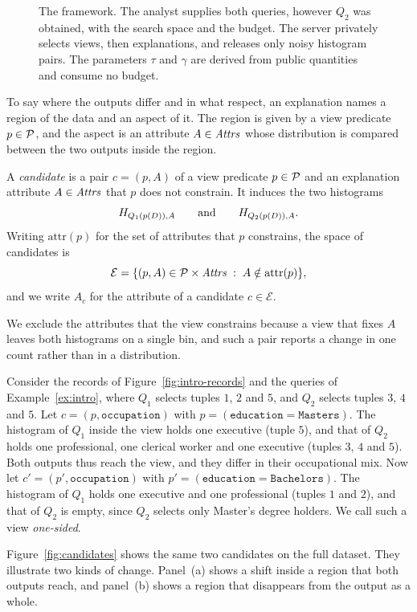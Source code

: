 \begin{figure}[t]
\centering

\caption{The \sys{} framework. The analyst supplies both queries, however $Q_2$ was obtained, with the search space and the budget. The server privately selects views, then explanations, and releases only noisy histogram pairs. The parameters $\tau$ and $\gamma$ are derived from public quantities and consume no budget.}
\label{fig:framework}
\end{figure}

To say where the outputs differ and in what respect, an explanation names a region of the data and an aspect of it.
The region is given by a view predicate $p\in\mathcal{P}$, and the aspect is an attribute $A\in\mathit{Attrs}$ whose distribution is compared between the two outputs inside the region.

\begin{definition}
\label{def:candidate}
A \emph{candidate} is a pair $c=(p,A)$ of a view predicate $p\in\mathcal{P}$ and an explanation attribute $A\in\mathit{Attrs}$ that $p$ does not constrain.
It induces the two histograms
\[
    H_{Q_1(p(D)),A}
    \qquad\text{and}\qquad
    H_{Q_2(p(D)),A}.
\]
Writing $\mathrm{attr}(p)$ for the set of attributes that $p$ constrains, the space of candidates is
\[
\mathcal{E}=\{(p,A)\in\mathcal{P}\times\mathit{Attrs} \;:\; A\notin\mathrm{attr}(p)\},
\]
and we write $A_c$ for the attribute of a candidate $c\in\mathcal{E}$.
\end{definition}

We exclude the attributes that the view constrains because a view that fixes $A$ leaves both histograms on a single bin, and such a pair reports a change in one count rather than in a distribution.

\begin{example}
\label{ex:candidate}
Consider the records of Figure~\ref{fig:intro-records} and the queries of Example~\ref{ex:intro}, where $Q_1$ selects tuples $1$, $2$ and $5$, and $Q_2$ selects tuples $3$, $4$ and $5$.
Let $c=(p,\texttt{occupation})$ with $p=(\texttt{education}=\texttt{Masters})$.
The histogram of $Q_1$ inside the view holds one executive (tuple $5$), and that of $Q_2$ holds one professional, one clerical worker and one executive (tuples $3$, $4$ and $5$).
Both outputs thus reach the view, and they differ in their occupational mix.
Now let $c'=(p',\texttt{occupation})$ with $p'=(\texttt{education}=\texttt{Bachelors})$.
The histogram of $Q_1$ holds one executive and one professional (tuples $1$ and $2$), and that of $Q_2$ is empty, since $Q_2$ selects only Master's degree holders.
We call such a view \emph{one-sided}.

Figure~\ref{fig:candidates} shows the same two candidates on the full dataset.
They illustrate two kinds of change.
Panel~(a) shows a shift inside a region that both outputs reach, and panel~(b) shows a region that disappears from the output as a whole.
\end{example}

